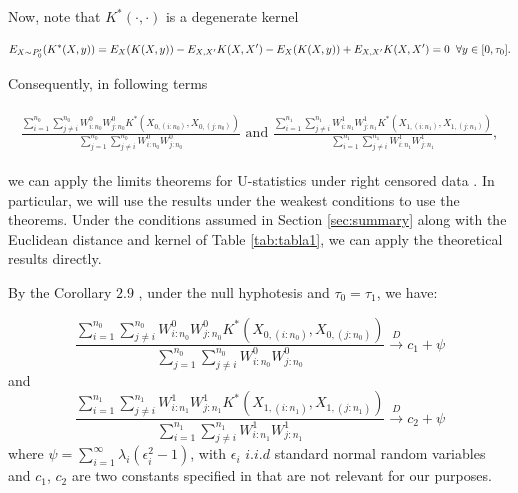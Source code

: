 \documentclass[11pt]{article}
\begin{document}
\begin{appendices}
  
Now, note  that $K^{*}(\cdot,\cdot)$ is a degenerate kernel


  \begin{gather}
\begin{align*}
E_{X\sim^{} P_0^{\prime}}(K^{*}(X,y))= E_{X}(K(X,y)) - E_{X,X^{\prime}} K(X,X^{\prime}) -E_{X}(K(X,y))+E_{X,X^{\prime}} K(X,X^{\prime})=0 \hspace{0.2cm} \forall y \in [0,\tau_0].
\end{align*}
  \end{gather}

Consequently, in following terms

  \begin{gather}
\begin{align*}
\frac{\sum_{i=1}^{n_0}  \sum_{j\neq i}^{n_0} W^{0}_{i:n_0} W^{0}_{j:n_0} K^{*}(X_{0,(i:n_0)},X_{0,(j:n_0)})}{ \sum_{j=1}^{n_0} \sum_{j\neq i}^{n_0} W^{0}_{i:n_0} W^{0}_{j:n_0}}  \text{ and } \frac{\sum_{i=1}^{n_1}  \sum_{j\neq i}^{n_1} W^{1}_{i:n_1} W^{1}_{j:n_1}  K^{*}(X_{1,(i:n_1)},X_{1,(j:n_1)})}{\sum_{i=1}^{n_1}  \sum_{j\neq i }^{n_1}W^{1}_{i:n_1} W^{1}_{j:n_1}} \nonumber,
\end{align*}
  \end{gather}


we can apply the limits theorems for U-statistics under right censored data \cite{BOSE200284,fernndez2018kaplanmeier}. In particular, we will use the results \cite{fernndez2018kaplanmeier} under the weakest conditions to use the theorems. Under the conditions  assumed in Section \ref{sec:summary} along with the Euclidean distance and kernel of Table \ref{tab:tabla1},  we   can apply  the theoretical results directly.

By the Corollary $2.9$ \cite{fernndez2018kaplanmeier}, under the null hyphotesis and $\tau_0= \tau_1$,  we have:




$$\frac{\sum_{i=1}^{n_0}  \sum_{j\neq i}^{n_0} W^{0}_{i:n_0} W^{0}_{j:n_0} K^{*}(X_{0,(i:n_0)},X_{0,(j:n_0)})}{ \sum_{j=1}^{n_0} \sum_{j\neq i}^{n_0} W^{0}_{i:n_0} W^{0}_{j:n_0}}  \overset{D}{\to} c_1 + \psi$$
and 
$$\frac{\sum_{i=1}^{n_1}  \sum_{j\neq i}^{n_1} W^{1}_{i:n_1} W^{1}_{j:n_1}  K^{*}(X_{1,(i:n_1)},X_{1,(j:n_1)})}{\sum_{i=1}^{n_1}  \sum_{j\neq i }^{n_1}W^{1}_{i:n_1} W^{1}_{j:n_1}}  \overset{D}{\to} c_2 + \psi$$
where $\psi= \sum_{i=1}^{\infty} \lambda_i (\epsilon_i^{2}-1)$, with $\epsilon_{i}$ $i.i.d$ standard normal random variables and $c_1$, $c_2$ are two constants specified in \cite{fernndez2018kaplanmeier} that are not relevant for our purposes.




\end{appendices}
\end{document}
